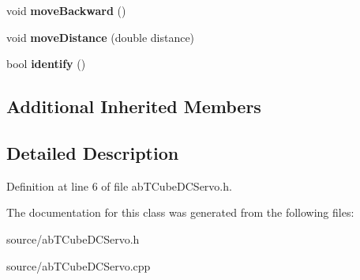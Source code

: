 \begin{DoxyCompactItemize}
\item 
void {\bfseries move\+Backward} ()\hypertarget{class_t_cube_d_c_servo_a2339bc46a8c2434273157a721933a4b1}{}\label{class_t_cube_d_c_servo_a2339bc46a8c2434273157a721933a4b1}

\item 
void {\bfseries move\+Distance} (double distance)\hypertarget{class_t_cube_d_c_servo_a5fbed128911d93cd01f461ea3e031d90}{}\label{class_t_cube_d_c_servo_a5fbed128911d93cd01f461ea3e031d90}

\item 
bool {\bfseries identify} ()\hypertarget{class_t_cube_d_c_servo_aa8513d736e0e795921c0d4d85783ba53}{}\label{class_t_cube_d_c_servo_aa8513d736e0e795921c0d4d85783ba53}

\end{DoxyCompactItemize}
\subsection*{Additional Inherited Members}


\subsection{Detailed Description}


Definition at line 6 of file ab\+T\+Cube\+D\+C\+Servo.\+h.



The documentation for this class was generated from the following files\+:\begin{DoxyCompactItemize}
\item 
source/ab\+T\+Cube\+D\+C\+Servo.\+h\item 
source/ab\+T\+Cube\+D\+C\+Servo.\+cpp\end{DoxyCompactItemize}
